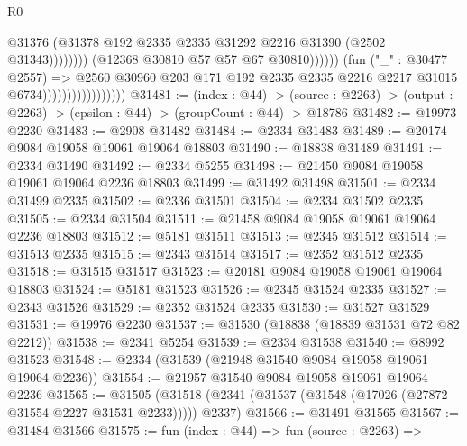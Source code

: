 \begin{lexlean}{R0}
\begin{coremodule}
                                                          @31376
                                                          (@31378
                                                            @192
                                                            @2335
                                                            @2335
                                                            @31292
                                                            @2216
                                                            @31390
                                                            (@2502 @31343))))))))
                                              (@12368 @30810 @57 @57 @67 @30810))))))
                                    (fun ("_" : @30477 @2557) =>
                                    @2560
                                      @30960
                                      @203
                                      @171
                                      @192
                                      @2335
                                      @2335
                                      @2216
                                      @2217
                                      @31015
                                      @6734)))))))))))))))))
@31481 := (index : @44) ->
  (source : @2263) -> (output : @2263) -> (epsilon : @44) -> (groupCount : @44) -> @18786
@31482 := @19973 @2230
@31483 := @2908 @31482
@31484 := @2334 @31483
@31489 := @20174 @9084 @19058 @19061 @19064 @18803
@31490 := @18838 @31489
@31491 := @2334 @31490
@31492 := @2334 @5255
@31498 := @21450 @9084 @19058 @19061 @19064 @2236 @18803
@31499 := @31492 @31498
@31501 := @2334 @31499 @2335
@31502 := @2336 @31501
@31504 := @2334 @31502 @2335
@31505 := @2334 @31504
@31511 := @21458 @9084 @19058 @19061 @19064 @2236 @18803
@31512 := @5181 @31511
@31513 := @2345 @31512
@31514 := @31513 @2335
@31515 := @2343 @31514
@31517 := @2352 @31512 @2335
@31518 := @31515 @31517
@31523 := @20181 @9084 @19058 @19061 @19064 @18803
@31524 := @5181 @31523
@31526 := @2345 @31524 @2335
@31527 := @2343 @31526
@31529 := @2352 @31524 @2335
@31530 := @31527 @31529
@31531 := @19976 @2230
@31537 := @31530 (@18838 (@18839 @31531 @72 @82 @2212))
@31538 := @2341 @5254
@31539 := @2334 @31538
@31540 := @8992 @31523
@31548 := @2334 (@31539 (@21948 @31540 @9084 @19058 @19061 @19064 @2236))
@31554 := @21957 @31540 @9084 @19058 @19061 @19064 @2236
@31565 := @31505
    (@31518 (@2341 (@31537 (@31548 (@17026 (@27872 @31554 @2227 @31531 @2233))))) @2337)
@31566 := @31491 @31565
@31567 := @31484 @31566
@31575 := fun (index : @44) =>
  fun (source : @2263) =>

\end{coremodule}
\end{lexlean}

